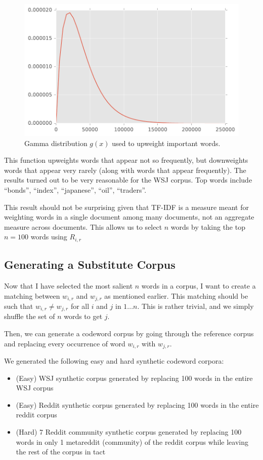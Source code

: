 \begin{figure}[h]
\centering
\includegraphics[width=.5\textwidth]{figures/gamma-dist.pdf}
\caption{Gamma distribution $g(x)$ used to upweight important words.}
\label{fig-gamma-dist}
\end{figure}

This function upweights words that appear not so frequently, but downweights words that appear very rarely (along with words that appear frequently). The results turned out to be very reasonable for the WSJ corpus. Top words include ``bonds'', ``index'', ``japanese'', ``oil'', ``traders''.

This result should not be surprising given that TF-IDF is a measure meant for weighting words in a single document among many documents, not an aggregate measure across documents.
This allows us to select $n$ words by taking the top $n = 100$ words using $R_{i,r}$

\subsection{Generating a Substitute Corpus}

Now that I have selected the most salient $n$ words in a corpus, I want to create a matching between $w_{i, r}$ and $w_{j, r}$ as mentioned earlier. This matching should be such that $w_{i, r} \neq w_{j, r}$ for all $i$ and $j$ in $1 ... n$. This is rather trivial, and we simply shuffle the set of $n$ words to get $j$.

Then, we can generate a codeword corpus by going through the reference corpus and replacing every occurrence of word $w_{i, r}$ with $w_{j, r}$.

We generated the following easy and hard synthetic codeword corpora:

\begin{itemize}
\item (Easy) WSJ synthetic corpus generated by replacing 100 words in the entire WSJ corpus
\item (Easy) Reddit synthetic corpus generated by replacing 100 words in the entire reddit corpus
\item (Hard) 7 Reddit community synthetic corpus generated by replacing 100 words in only 1 metareddit (community) of the reddit corpus while leaving the rest of the corpus in tact
\end{itemize}